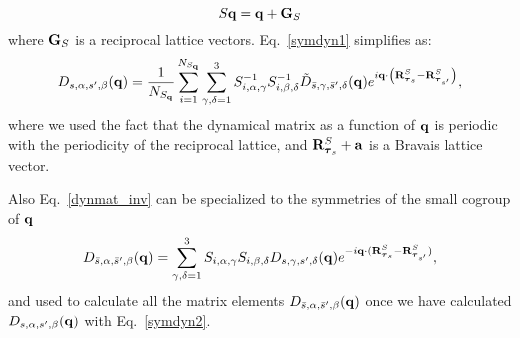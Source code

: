 \documentclass[12pt,a4paper,twoside]{report}
\begin{document}
\begin{equation}
S {\bf q} = {\bf q} + {\bf G}_S
\end{equation}
where ${\bf G}_S$ is a reciprocal lattice vectors.
Eq.~\ref{symdyn1} simplifies as:
\begin{equation}
D_{s,\alpha,s',\beta}({\bf q}) ={1\over N_{S_{\bf q}}}
\sum_{i=1}^{N_{S_{\bf q}}}
\sum_{\gamma,\delta=1}^3  S^{-1}_{i,\alpha,\gamma} S^{-1}_{i,\beta,\delta}
\tilde D_{\bar s,\gamma,\bar s',\delta}({\bf q})
e^{i {\bf q} \cdot \left( {\bf R}^{S}_{\boldsymbol{\tau}_s} - {\bf R}^{S}_{\boldsymbol{\tau}_{s'}} \right) },
\label{symdyn2}
\end{equation}
where we used the fact that the dynamical matrix as a function of ${\bf q}$ is periodic with the periodicity of the reciprocal lattice, and
${\bf R}^{S}_{\boldsymbol{\tau}_s}+{\bf a}$ is a
Bravais lattice vector.

Also Eq.~\ref{dynmat_inv} can be specialized to the symmetries of the small cogroup of ${\bf q}$
\begin{equation}
D_{\bar s,\alpha,\bar s',\beta}({\bf q}) =
\sum_{\gamma,\delta=1}^3  S_{i,\alpha,\gamma} S_{i,\beta,\delta}
D_{s,\gamma,s',\delta}({\bf q})
e^{-i {\bf q} \cdot ({\bf R}^{S}_{\boldsymbol{\tau}_s} - {\bf R}^{S}_{\boldsymbol{\tau}_{s'}})},
\label{dynmat_inv_smallq}
\end{equation}
and used to calculate all the matrix elements  
$D_{\bar s,\alpha,\bar s',\beta}({\bf q})$ once
we have calculated 
$D_{s,\alpha,s',\beta}({\bf q})$ with Eq.~\ref{symdyn2}.
\end{document}
